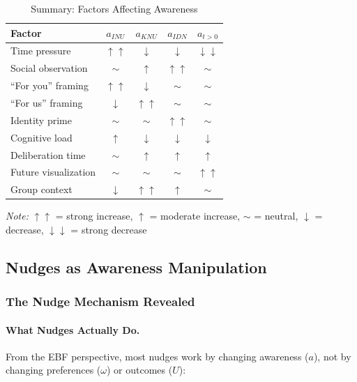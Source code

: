 \begin{table}[htbp]
\centering
\caption{Summary: Factors Affecting Awareness}
\label{tab:awareness-summary}
\small
\renewcommand{\arraystretch}{1.2}
\begin{tabular}{@{}lcccc@{}}
\toprule
\textbf{Factor} & $a_{INU}$ & $a_{KNU}$ & $a_{IDN}$ & $a_{t>0}$ \\
\midrule
Time pressure & $\uparrow\uparrow$ & $\downarrow$ & $\downarrow$ & $\downarrow\downarrow$ \\
Social observation & $\sim$ & $\uparrow$ & $\uparrow\uparrow$ & $\sim$ \\
``For you'' framing & $\uparrow\uparrow$ & $\downarrow$ & $\sim$ & $\sim$ \\
``For us'' framing & $\downarrow$ & $\uparrow\uparrow$ & $\sim$ & $\sim$ \\
Identity prime & $\sim$ & $\sim$ & $\uparrow\uparrow$ & $\sim$ \\
Cognitive load & $\uparrow$ & $\downarrow$ & $\downarrow$ & $\downarrow$ \\
Deliberation time & $\sim$ & $\uparrow$ & $\uparrow$ & $\uparrow$ \\
Future visualization & $\sim$ & $\sim$ & $\sim$ & $\uparrow\uparrow$ \\
Group context & $\downarrow$ & $\uparrow\uparrow$ & $\uparrow$ & $\sim$ \\
\bottomrule
\end{tabular}
\begin{flushleft}
\small\textit{Note:} $\uparrow\uparrow$ = strong increase, $\uparrow$ = moderate increase, 
$\sim$ = neutral, $\downarrow$ = decrease, $\downarrow\downarrow$ = strong decrease
\end{flushleft}
\end{table}

\subsection{Nudges as Awareness Manipulation}
\label{subsec:nudges-awareness}

\subsubsection{The Nudge Mechanism Revealed}

\paragraph{What Nudges Actually Do.}
From the EBF perspective, most nudges work by changing awareness ($a$),
not by changing preferences ($\omega$) or outcomes ($U$):

